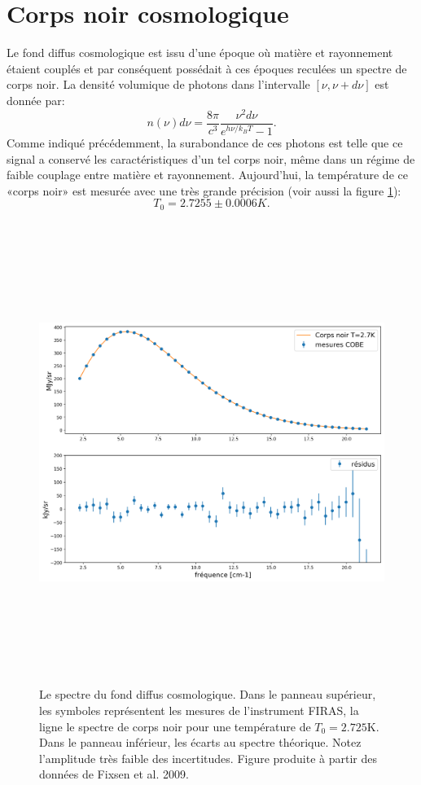 \section{Corps noir cosmologique}
Le fond diffus cosmologique est issu d'une époque où matière et rayonnement étaient couplés et par conséquent possédait à ces époques reculées un spectre de corps noir. La densité volumique de photons dans l'intervalle $[\nu,\nu+d\nu]$ est donnée par:
\begin{equation}
n(\nu)d\nu=\frac{8\pi}{c^3}\frac{\nu^2d\nu}{e^{h\nu/k_BT}-1}.
\end{equation}
Comme indiqué précédemment, la surabondance de ces photons est telle que ce signal a conservé les caractéristiques d'un tel corps noir, même dans un régime de faible couplage entre matière et rayonnement. Aujourd'hui, la température de ce «corps noir» est mesurée avec une très grande précision  (voir aussi la figure \ref{f:bb}):
\begin{equation}
T_0=2.7255\pm0.0006 K.
\end{equation}
\begin{figure}[htbp]
	\centering
		\includegraphics[height=15cm]{figs/bb.png}
		\caption[Le spectre du fond diffus cosmologique]{Le spectre du fond diffus cosmologique. Dans le panneau supérieur, les symboles représentent les mesures de l'instrument FIRAS, la ligne le spectre de corps noir pour une température de $T_0=2.725$K. Dans le panneau inférieur, les écarts au spectre théorique. Notez l'amplitude très faible des incertitudes. Figure produite à partir des données de Fixsen et al. 2009.}
	\label{f:bb}
\end{figure}
